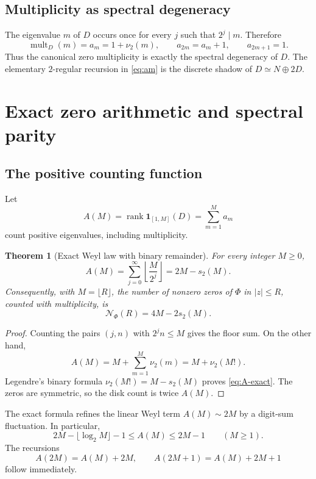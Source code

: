 \documentclass[11pt,oneside]{article}
\numberwithin{equation}{section}
\theoremstyle{plain}
\newtheorem{theorem}{Theorem}[section]
\theoremstyle{definition}
\theoremstyle{remark}
\newcommand{\rank}{\operatorname{rank}}
\begin{document}
\subsection{Multiplicity as spectral degeneracy}

The eigenvalue $m$ of $D$ occurs once for every $j$ such that $2^j\mid m$.  Therefore
\begin{equation}\label{eq:am}
 \operatorname{mult}_D(m)=a_m=1+\nu_2(m),
 \qquad
 a_{2m}=a_m+1,
 \qquad
 a_{2m+1}=1.
\end{equation}
Thus the canonical zero multiplicity is exactly the spectral degeneracy of $D$.  The elementary $2$-regular recursion in \cref{eq:am} is the discrete shadow of $D\simeq N\oplus2D$.

\section{Exact zero arithmetic and spectral parity}

\subsection{The positive counting function}

Let
\[
 A(M)=\rank\mathbf 1_{[1,M]}(D)
 =\sum_{m=1}^{M}a_m
\]
count positive eigenvalues, including multiplicity.

\begin{theorem}[Exact Weyl law with binary remainder]\label{thm:counting}
For every integer $M\ge0$,
\begin{equation}\label{eq:A-exact}
 \boxed{\ A(M)=\sum_{j=0}^{\infty}\left\lfloor\frac{M}{2^j}\right\rfloor
 =2M-s_2(M).\ }
\end{equation}
Consequently, with $M=\lfloor R\rfloor$, the number of nonzero zeros of $\Phi$ in $|z|\le R$, counted with multiplicity, is
\begin{equation}\label{eq:Nphi}
 \boxed{\ \mathcal N_\Phi(R)=4M-2s_2(M).\ }
\end{equation}
\end{theorem}

\begin{proof}
Counting the pairs $(j,n)$ with $2^jn\le M$ gives the floor sum.  On the other hand,
\[
 A(M)=M+\sum_{m=1}^{M}\nu_2(m)
 =M+\nu_2(M!).
\]
Legendre's binary formula $\nu_2(M!)=M-s_2(M)$ proves \cref{eq:A-exact}.  The zeros are symmetric, so the disk count is twice $A(M)$.
\end{proof}

The exact formula refines the linear Weyl term $A(M)\sim2M$ by a digit-sum fluctuation.  In particular,
\begin{equation}\label{eq:A-bounds}
 2M-\lfloor\log_2M\rfloor-1\le A(M)\le2M-1
 \qquad(M\ge1).
\end{equation}
The recursions
\begin{equation}\label{eq:A-rec}
 A(2M)=A(M)+2M,
 \qquad
 A(2M+1)=A(M)+2M+1
\end{equation}
follow immediately.
\end{document}
